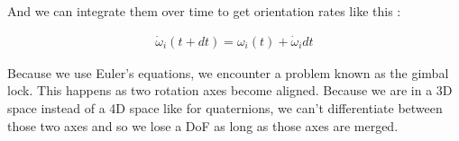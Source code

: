 And we can integrate them over time to get orientation rates like this :

\begin{gather*}
    \dot{\omega}_i(t + dt) = \omega_i(t) + \dot{\omega}_i dt
\end{gather*}

Because we use Euler's equations, we encounter a problem known as the gimbal
lock. This happens as two rotation axes become aligned. Because we are in a 3D
space instead of a 4D space like for quaternions, we can't differentiate
between those two axes and so we lose a DoF as long as those axes are merged.
